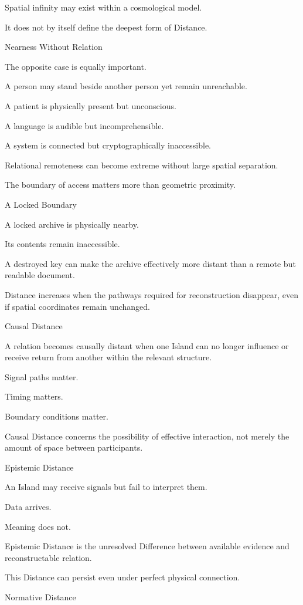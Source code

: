 Spatial infinity may exist within a cosmological model.

It does not by itself define the deepest form of Distance.

Nearness Without Relation

The opposite case is equally important.

A person may stand beside another person yet remain unreachable.

A patient is physically present but unconscious.

A language is audible but incomprehensible.

A system is connected but cryptographically inaccessible.

Relational remoteness can become extreme without large spatial separation.

The boundary of access matters more than geometric proximity.

A Locked Boundary

A locked archive is physically nearby.

Its contents remain inaccessible.

A destroyed key can make the archive effectively more distant than a remote but readable document.

Distance increases when the pathways required for reconstruction disappear, even if spatial coordinates remain unchanged.

Causal Distance

A relation becomes causally distant when one Island can no longer influence or receive return from another within the relevant structure.

Signal paths matter.

Timing matters.

Boundary conditions matter.

Causal Distance concerns the possibility of effective interaction, not merely the amount of space between participants.

Epistemic Distance

An Island may receive signals but fail to interpret them.

Data arrives.

Meaning does not.

Epistemic Distance is the unresolved Difference between available evidence and reconstructable relation.

This Distance can persist even under perfect physical connection.

Normative Distance

